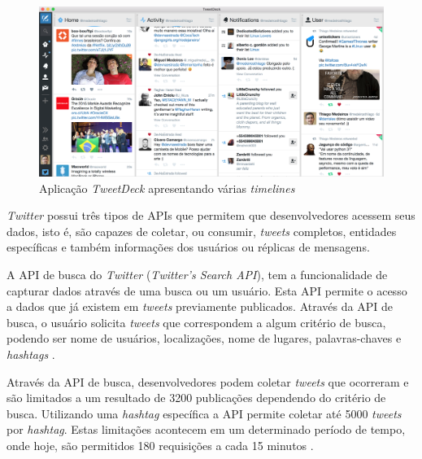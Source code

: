 \begin{figure}[h]
  \centering
  \includegraphics[width=1\textwidth]{Cap4/imagens/tweet-deck}
  \caption{Aplicação \textit{TweetDeck} apresentando várias \textit{timelines}}
  \vspace{-0.3cm}
  \label{fig:tweet-deck}
\end{figure}


\textit{Twitter} possui três tipos de APIs que permitem que desenvolvedores acessem seus dados, isto é, são capazes de coletar, ou consumir, \textit{tweets} completos, entidades específicas e também informações dos usuários ou réplicas de mensagens.

A API de busca do \textit{Twitter} (\textit{Twitter's Search API}), tem a funcionalidade de capturar dados através de uma busca ou um usuário. Esta API permite o acesso a dados que já existem em \textit{tweets} previamente publicados. Através da API de busca, o usuário solicita \textit{tweets} que correspondem a algum critério de busca, podendo ser nome de usuários, localizações, nome de lugares, palavras-chaves e \textit{hashtags} \cite{twitter-doc}.

Através da API de busca, desenvolvedores podem coletar \textit{tweets} que ocorreram e são limitados a um resultado de 3200 publicações dependendo do critério de busca. Utilizando uma \textit{hashtag} específica a API permite coletar até 5000 \textit{tweets} por \textit{hashtag}. Estas limitações acontecem em um determinado período de tempo, onde hoje, são permitidos 180 requisições a cada 15 minutos \cite{twitter-doc}.

